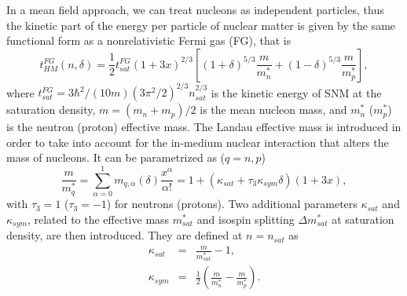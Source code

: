 In a mean field approach, we can treat nucleons as independent
particles, thus the kinetic part of the energy per particle of nuclear matter 
is given by the same functional form as a nonrelativistic Fermi gas (FG), that 
is
%
\begin{equation}
  t_{HM}^{FG}(n,\delta) =
  \frac{1}{2}t_{sat}^{FG}(1+3x)^{2/3}\left[(1+\delta)^{5/3}\frac{m}{m_n^*} +
  (1-\delta)^{5/3}\frac{m}{m_p^*}\right],
\end{equation}
%
where $t_{sat}^{FG} = 3\hbar^2/(10m)(3\pi^2/2)^{2/3}n_{sat}^{2/3}$ is the
kinetic energy of SNM at the saturation density, $m = (m_n + m_p)/2$ is the
mean nucleon mass, and $m_n^*$ ($m_p^*$) is the neutron (proton) effective
mass. The Landau effective mass is introduced in order to take into account for 
the in-medium nuclear interaction that alters the mass of nucleons. It can be
parametrized as ($q=n,p$)
%
\begin{equation}
  \frac{m}{m_q^*} = \sum_{\alpha=0}^1
  m_{q,\alpha}(\delta)\frac{x^\alpha}{\alpha!}
  = 1 + (\kappa_{sat} + \tau_3\kappa_{sym}\delta)(1+3x),
\end{equation}
%
with $\tau_3 = 1$ ($\tau_3 = -1$) for neutrons (protons).
Two additional parameters $\kappa_{sat}$ and $\kappa_{sym}$, related to the 
effective mass $m_{sat}^*$ and isospin splitting $\Delta m_{sat}^*$ at 
saturation density, are then introduced. They are defined at $n = n_{sat}$ as
%
\begin{eqnarray}
  \kappa_{sat} &=& \frac{m}{m_{sat}^*} - 1,\\
  \kappa_{sym} &=& \frac{1}{2}\left(\frac{m}{m_n^*} - \frac{m}{m_p^*}\right).
\end{eqnarray}
%

